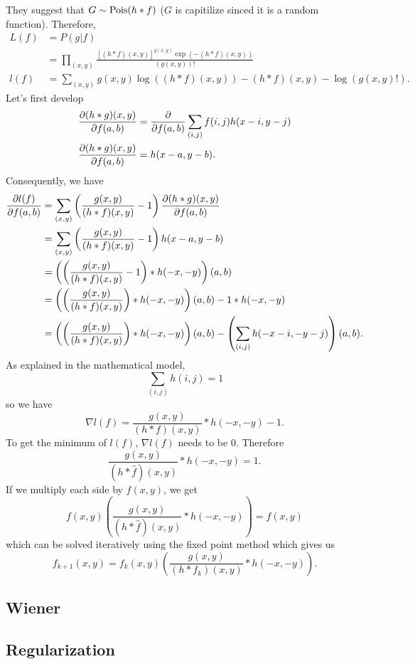 They suggest that $G \sim \operatorname{Pois}(h * f)$ ($G$ is capitilize sinced it is a random function).
Therefore,
\begin{align*}
  L(f) & = P(g|f)\\
  & = \prod_{(x,y)} \frac{[(h*f)(x,y)]^{g(x,y)} \exp(-(h*f)(x,y))}{(g(x,y))!}\\
  l(f) & = \sum_{(x,y)} g(x,y)\log((h*f)(x,y)) - (h*f)(x,y) -\log(g(x,y)!).
\end{align*}
Let's first develop
\begin{align*}
  \frac{\partial (h*g)(x,y)}{\partial f(a,b)} & = \frac{\partial }{\partial f(a,b)}\sum_{(i,j)}f(i,j)h(x-i,y-j)\\
  \frac{\partial (h*g)(x,y)}{\partial f(a,b)} & = h(x-a,y-b).
\end{align*}
Consequently, we have
\begin{align*}
  \frac{\partial l(f)}{\partial f(a,b)} & = \sum_{(x,y)} \left(\frac{g(x,y)}{(h*f)(x,y)} - 1\right) \frac{\partial (h*g)(x,y)}{\partial f(a,b)}\\
  & = \sum_{(x,y)} \left(\frac{g(x,y)}{(h*f)(x,y)} - 1\right) h(x-a,y-b)\\
  & = \left(\left(\frac{g(x,y)}{(h*f)(x,y)} - 1\right) * h(-x,-y)\right)(a,b)\\
  & = \left(\left(\frac{g(x,y)}{(h*f)(x,y)}\right) * h(-x,-y)\right)(a,b) - 1 * h(-x,-y)\\
  & = \left(\left(\frac{g(x,y)}{(h*f)(x,y)}\right) * h(-x,-y)\right)(a,b) - \left(\sum_{(i,j)} h(-x-i,-y-j)\right)(a,b).
\end{align*}
As explained in the mathematical model,
\[ \sum_{(i,j)} h(i,j) = 1 \]
so we have
\[ \nabla l(f) = \frac{g(x,y)}{(h*f)(x,y)} * h(-x,-y) - 1. \]
To get the minimum of $l(f)$, $\nabla l(f)$ needs to be 0.
Therefore %
\[ \frac{g(x,y)}{(h*\hat{f})(x,y)} * h(-x,-y) = 1. \]
If we multiply each side by $f(x,y)$, we get
\[ f(x,y)\left(\frac{g(x,y)}{(h*\hat{f})(x,y)} * h(-x,-y)\right) = f(x,y) \]
which can be solved iteratively using the fixed point method which gives us
\[ f_{k+1}(x,y) = f_k(x,y)\left(\frac{g(x,y)}{(h*f_k)(x,y)} * h(-x,-y)\right). \]

\subsection{Wiener}

\subsection{Regularization}
